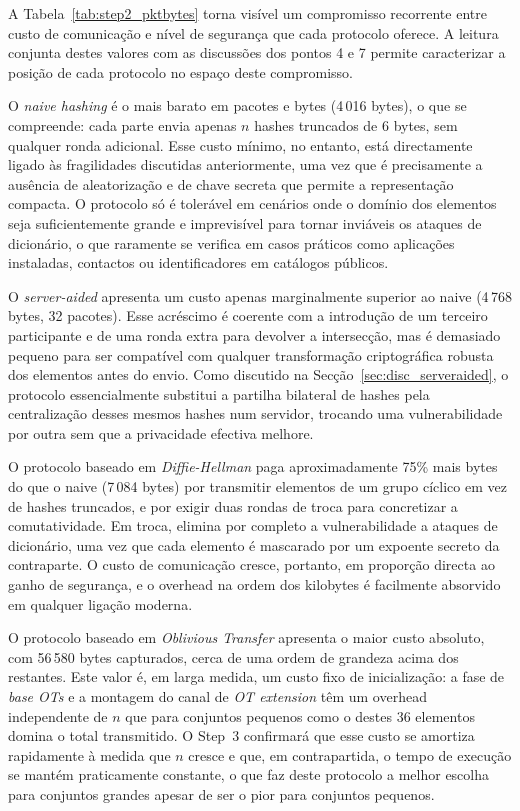 A Tabela~\ref{tab:step2_pktbytes} torna visível um compromisso recorrente entre custo de comunicação e nível de segurança que cada protocolo oferece. A leitura conjunta destes valores com as discussões dos pontos 4 e 7 permite caracterizar a posição de cada protocolo no espaço deste compromisso.

O \emph{naive hashing} é o mais barato em pacotes e bytes (4\,016 bytes), o que se compreende: cada parte envia apenas $n$ hashes truncados de 6 bytes, sem qualquer ronda adicional. Esse custo mínimo, no entanto, está directamente ligado às fragilidades discutidas anteriormente, uma vez que é precisamente a ausência de aleatorização e de chave secreta que permite a representação compacta. O protocolo só é tolerável em cenários onde o domínio dos elementos seja suficientemente grande e imprevisível para tornar inviáveis os ataques de dicionário, o que raramente se verifica em casos práticos como aplicações instaladas, contactos ou identificadores em catálogos públicos.

O \emph{server-aided} apresenta um custo apenas marginalmente superior ao naive (4\,768 bytes, 32 pacotes). Esse acréscimo é coerente com a introdução de um terceiro participante e de uma ronda extra para devolver a intersecção, mas é demasiado pequeno para ser compatível com qualquer transformação criptográfica robusta dos elementos antes do envio. Como discutido na Secção~\ref{sec:disc_serveraided}, o protocolo essencialmente substitui a partilha bilateral de hashes pela centralização desses mesmos hashes num servidor, trocando uma vulnerabilidade por outra sem que a privacidade efectiva melhore.

O protocolo baseado em \emph{Diffie-Hellman} paga aproximadamente 75\% mais bytes do que o naive (7\,084 bytes) por transmitir elementos de um grupo cíclico em vez de hashes truncados, e por exigir duas rondas de troca para concretizar a comutatividade. Em troca, elimina por completo a vulnerabilidade a ataques de dicionário, uma vez que cada elemento é mascarado por um expoente secreto da contraparte. O custo de comunicação cresce, portanto, em proporção directa ao ganho de segurança, e o overhead na ordem dos kilobytes é facilmente absorvido em qualquer ligação moderna.

O protocolo baseado em \emph{Oblivious Transfer} apresenta o maior custo absoluto, com 56\,580 bytes capturados, cerca de uma ordem de grandeza acima dos restantes. Este valor é, em larga medida, um custo fixo de inicialização: a fase de \emph{base OTs} e a montagem do canal de \emph{OT extension} têm um overhead independente de $n$ que para conjuntos pequenos como o destes 36 elementos domina o total transmitido. O Step~3 confirmará que esse custo se amortiza rapidamente à medida que $n$ cresce e que, em contrapartida, o tempo de execução se mantém praticamente constante, o que faz deste protocolo a melhor escolha para conjuntos grandes apesar de ser o pior para conjuntos pequenos.

